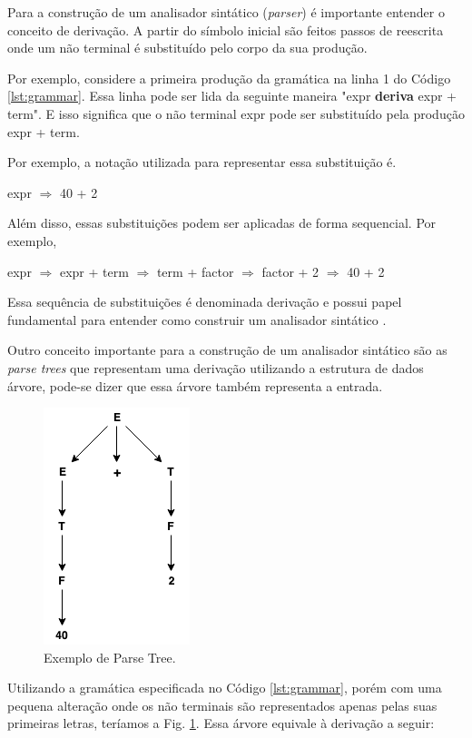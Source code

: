 Para a construção de um analisador sintático (\textit{parser}) é importante entender o conceito de derivação. 
A partir do símbolo inicial são feitos passos de reescrita onde um não terminal é substituído pelo
corpo da sua produção. 

Por exemplo, considere a primeira produção da gramática na linha 1 do Código \ref{lst:grammar}. 
Essa linha pode ser lida da seguinte maneira "expr \textbf{deriva} expr + term". 
E isso significa que o não terminal expr pode ser substituído pela produção expr + term. 

Por exemplo, a notação utilizada para representar essa substituição é.
\begin{center}
expr $\Rightarrow$ 40 + 2
\end{center}
Além disso, essas substituições podem ser aplicadas de forma sequencial. Por exemplo,
\begin{center}
    expr $\Rightarrow$ expr + term $\Rightarrow$ term + factor $\Rightarrow$ factor + 2 $\Rightarrow$ 40 + 2
\end{center}
Essa sequência de substituições é denominada derivação e possui papel fundamental para entender
como construir um analisador sintático \cite{aho2006}. 

Outro conceito importante para a construção de um analisador sintático são
as \textit{parse trees} que representam uma derivação utilizando a estrutura de dados árvore, 
pode-se dizer que essa árvore também representa a entrada.

\begin{figure}[h]
	\centering
	\includegraphics[keepaspectratio=true,scale=1]{figuras/parsetree.png}
	\caption{Exemplo de Parse Tree.}
	\label{fig:parsetree}
\end{figure}

Utilizando a gramática especificada no Código \ref{lst:grammar}, porém com uma pequena alteração
onde os não terminais são representados apenas pelas suas primeiras letras, teríamos a Fig. \ref{fig:parsetree}. 
Essa árvore equivale à derivação a seguir:

